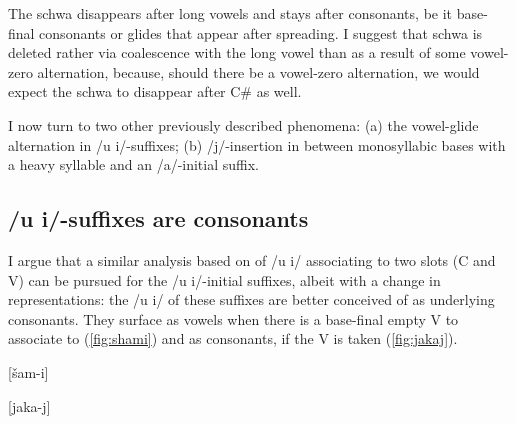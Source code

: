 \documentclass[a4paper, 12pt]{article}
\begin{document}
	\noindent The schwa disappears after long vowels and stays after consonants, be it base-final consonants or glides that appear after spreading. I suggest that schwa is deleted rather via coalescence with the long vowel than as a result of some vowel-zero alternation, because, should there be a vowel-zero alternation, we would expect the schwa to disappear after C\# as well.
	
	I now turn to two other previously described phenomena: (a) the vowel-glide alternation in /u i/-suffixes; (b) /j/-insertion in between monosyllabic bases with a heavy syllable and an /a/-initial suffix.
			
			\subsection{/u i/-suffixes are consonants}
			
	I argue that a similar analysis based on of /u i/ associating to two slots (C and V) can be pursued for the /u i/-initial suffixes, albeit with a change in representations: the /u i/ of these suffixes are better conceived of as underlying consonants. They surface as vowels when there is a base-final empty V to associate to (\ref{fig:shami}) and as consonants, if the V is taken (\ref{fig:jakaj}).
	
\begin{minipage}[t]{.45\linewidth}
			\ex\label{fig:shami} {[šam-i]} \\
			\xe
\end{minipage}
\hfill
\begin{minipage}[t]{.45\linewidth}
			\ex\label{fig:jakaj} {[jaka-j]} \\
			\xe
\end{minipage}	
	
\end{document}
